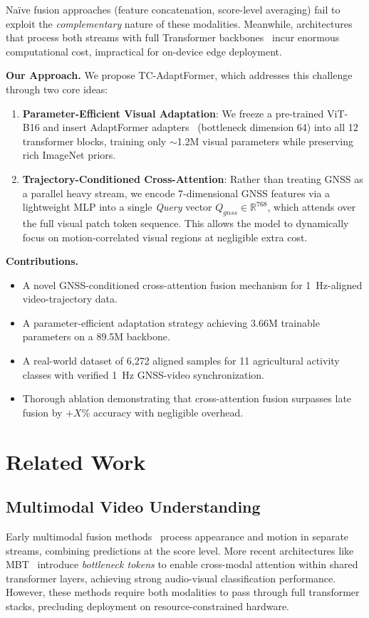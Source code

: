 \documentclass[10pt,twocolumn]{article}
\begin{document}
Naïve fusion approaches (feature concatenation, score-level averaging) fail to exploit the \emph{complementary} nature of these modalities. Meanwhile, architectures that process both streams with full Transformer backbones~\cite{nagrani2021attention} incur enormous computational cost, impractical for on-device edge deployment.

\textbf{Our Approach.} We propose TC-AdaptFormer, which addresses this challenge through two core ideas:
\begin{enumerate}
  \item \textbf{Parameter-Efficient Visual Adaptation}: We freeze a pre-trained ViT-B16 and insert AdaptFormer adapters~\cite{chen2022adaptformer} (bottleneck dimension 64) into all 12 transformer blocks, training only $\sim$1.2M visual parameters while preserving rich ImageNet priors.
  \item \textbf{Trajectory-Conditioned Cross-Attention}: Rather than treating GNSS as a parallel heavy stream, we encode 7-dimensional GNSS features via a lightweight MLP into a single \emph{Query} vector $Q_{gnss} \in \mathbb{R}^{768}$, which attends over the full visual patch token sequence. This allows the model to dynamically focus on motion-correlated visual regions at negligible extra cost.
\end{enumerate}

\textbf{Contributions.}
\begin{itemize}
  \item A novel GNSS-conditioned cross-attention fusion mechanism for 1~Hz-aligned video-trajectory data.
  \item A parameter-efficient adaptation strategy achieving 3.66M trainable parameters on a 89.5M backbone.
  \item A real-world dataset of 6,272 aligned samples for 11 agricultural activity classes with verified 1~Hz GNSS-video synchronization.
  \item Thorough ablation demonstrating that cross-attention fusion surpasses late fusion by $+X$\% accuracy with negligible overhead.
\end{itemize}

\section{Related Work}

\subsection{Multimodal Video Understanding}
Early multimodal fusion methods~\cite{simonyan2014twostream} process appearance and motion in separate streams, combining predictions at the score level. More recent architectures like MBT~\cite{nagrani2021attention} introduce \emph{bottleneck tokens} to enable cross-modal attention within shared transformer layers, achieving strong audio-visual classification performance. However, these methods require both modalities to pass through full transformer stacks, precluding deployment on resource-constrained hardware.
\end{document}
